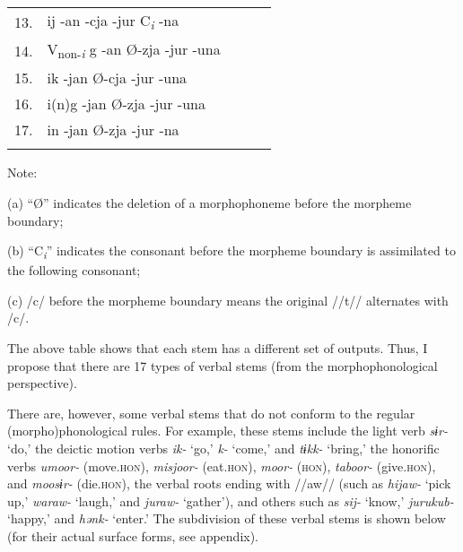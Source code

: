 \begin{table}
\begin{tabular}{l llll}
13.& ij    -an  -cja  -jur  C\textit{\textsubscript{i}} -na                                                                \\
14.& V\textsubscript{non-}\textit{\textsubscript{i}} g    -an  Ø-zja  -jur  -una                                           \\
15.& ik    -jan  Ø-cja  -jur  -una                                                                                         \\
16.& i(n)g    -jan  Ø-zja  -jur  -una                                                                                      \\
17.& in    -jan  Ø-zja  -jur  -na                                                                                          \\
\lspbottomrule
\end{tabular}

Note:

(a) “Ø” indicates the deletion of a morphophoneme before the morpheme boundary;

(b) “C\textit{\textsubscript{i}}” indicates the consonant before the morpheme boundary is assimilated to the following consonant;

(c) /c/ before the morpheme boundary means the original //t// alternates with /c/.
\end{table}

The above table shows that each stem has a different set of outputs. Thus, I propose that there are 17 types of verbal stems (from the morphophonological perspective).

There are, however, some verbal stems that do not conform to the regular (morpho)phonological rules. For example, these stems include the light verb \textit{sɨr-} ‘do,’ the deictic motion verbs \textit{ik-} ‘go,’ \textit{k-} ‘come,’ and \textit{tɨkk-} ‘bring,’ the honorific verbs \textit{umoor-} (move.\textsc{hon}), \textit{misjoor-} (eat.\textsc{hon}), \textit{moor-} (\textsc{hon}), \textit{taboor-} (give.\textsc{hon}), and \textit{moosɨr-} (die.\textsc{hon}), the verbal roots ending with //aw// (such as \textit{hijaw-} ‘pick up,’ \textit{waraw-} ‘laugh,’ and \textit{juraw-} ‘gather’), and others such as \textit{sij-} ‘know,’ \textit{jurukub-} ‘happy,’ and \textit{hənk-} ‘enter.’ The subdivision of these verbal stems is shown below (for their actual surface forms, see appendix).


